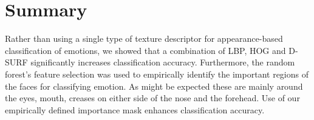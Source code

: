 %


%







%

\section{Summary}
\label{sec:ch4_Summary}
Rather than using a single type of texture descriptor for appearance-based classification of emotions, we showed that a combination of LBP, HOG and D-SURF significantly increases classification accuracy. Furthermore, the random forest's feature selection was used to empirically identify the important regions of the faces for classifying emotion.  As might be expected these are mainly around the eyes, mouth, creases on either side of the nose and the forehead.  Use of our empirically defined importance mask enhances classification accuracy.

